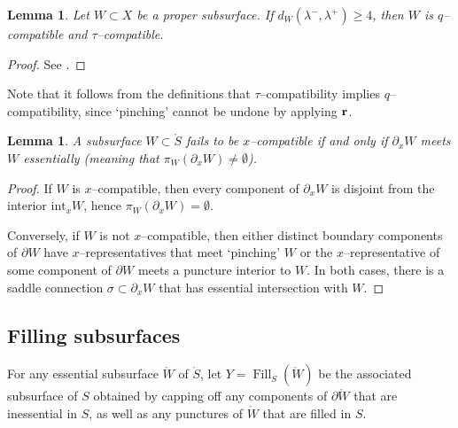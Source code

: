 \documentclass[11pt,letterpaper]{amsart}
\newcommand{\Fill}{\operatorname{Fill}}
\newcommand{\mr}{\mathring}
\newcommand{\bdy}{\partial} %
\newcommand{\psub}{\mr W}
\numberwithin{equation}{section}
\newtheorem{lemma}[theorem]{Lemma}
\theoremstyle{definition}
\renewcommand{\r}{{\bf r}}
\renewcommand{\int}{\mathrm{int}}
\begin{document}
\begin{lemma}\label{Lem:CompatibleProj}
Let $W \subset X$ be a proper subsurface. If $d_W(\lambda^-,\lambda^+)\ge 4$, then $W$ is $q$--compatible and $\tau$--compatible.
\end{lemma}

\begin{proof}
See \cite[Proposition 2.4 and Theorem 2.5]{MinskyTaylor:SubsurfaceDist}. 
\end{proof}

Note that it follows from the definitions that $\tau$--compatibility implies $q$--compatibility, since `pinching' cannot be undone by applying $\r$.



\begin{lemma}\label{lem:stuck}
A subsurface $W \subset \mr S$ fails to be $x$--compatible if and only if $\bdy_x W$ meets $W$ essentially (meaning that $\pi_{W}(\bdy_x W) \neq \emptyset$). 
\end{lemma}

\begin{proof}
If $W$ is $x$--compatible, then every component of $\bdy_x W$ is disjoint from the interior $\int_x W$, hence $\pi_{W}(\bdy_x W) = \emptyset$.

Conversely, if $W$ is not $x$--compatible, then either distinct boundary components of $\bdy W$ have $x$--representatives that meet `pinching' $W$ or the $x$--representative of some component of $\bdy W$ meets a puncture interior to $W$. In both cases, there is a saddle connection $\sigma \subset \bdy_x W$ that has essential intersection with $W$. 
\end{proof}



\subsection{Filling subsurfaces}\label{Sec:FillingSubsurfaces}

For any essential subsurface $\psub$ of $\mr S$, let $Y = \Fill_S(\psub)$ be the associated subsurface of $S$ obtained by capping off any components of $\bdy \psub$ that are inessential in $S$, as well as any punctures of $\psub$ that are filled in $S$. 
\end{document}
